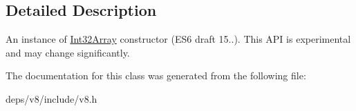 \subsection{Detailed Description}
An instance of \hyperlink{classv8_1_1_int32_array}{Int32\+Array} constructor (E\+S6 draft 15..). This A\+P\+I is experimental and may change significantly. 

The documentation for this class was generated from the following file\+:\begin{DoxyCompactItemize}
\item 
deps/v8/include/v8.\+h\end{DoxyCompactItemize}
